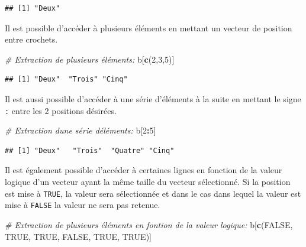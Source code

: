 \documentclass[
]{book}
\newenvironment{Shaded}{\begin{snugshade}}{\end{snugshade}}
\newcommand{\CommentTok}[1]{\textcolor[rgb]{0.56,0.35,0.01}{\textit{#1}}}
\newcommand{\ConstantTok}[1]{\textcolor[rgb]{0.56,0.35,0.01}{#1}}
\newcommand{\DecValTok}[1]{\textcolor[rgb]{0.00,0.00,0.81}{#1}}
\newcommand{\FunctionTok}[1]{\textcolor[rgb]{0.13,0.29,0.53}{\textbf{#1}}}
\newcommand{\NormalTok}[1]{#1}
\newcommand{\SpecialCharTok}[1]{\textcolor[rgb]{0.81,0.36,0.00}{\textbf{#1}}}
\begin{document}
\begin{verbatim}
## [1] "Deux"
\end{verbatim}

Il est possible d'accéder à plusieurs éléments en mettant un vecteur de position entre crochets.

\begin{Shaded}
\begin{Highlighting}[]
\CommentTok{\# Extraction de plusieurs éléments:}
\NormalTok{b[}\FunctionTok{c}\NormalTok{(}\DecValTok{2}\NormalTok{,}\DecValTok{3}\NormalTok{,}\DecValTok{5}\NormalTok{)]}
\end{Highlighting}
\end{Shaded}

\begin{verbatim}
## [1] "Deux"  "Trois" "Cinq"
\end{verbatim}

Il est aussi possible d'accéder à une série d'éléments à la suite en mettant le signe \texttt{:} entre les 2 positions désirées.

\begin{Shaded}
\begin{Highlighting}[]
\CommentTok{\# Extraction d\textquotesingle{}une série d\textquotesingle{}éléments:}
\NormalTok{b[}\DecValTok{2}\SpecialCharTok{:}\DecValTok{5}\NormalTok{]}
\end{Highlighting}
\end{Shaded}

\begin{verbatim}
## [1] "Deux"   "Trois"  "Quatre" "Cinq"
\end{verbatim}

Il est également possible d'accéder à certaines lignes en fonction de la valeur logique d'un vecteur ayant la même taille du vecteur sélectionné. Si la position est mise à \texttt{TRUE}, la valeur sera sélectionnée et dans le cas dans lequel la valeur est mise à \texttt{FALSE} la valeur ne sera pas retenue.

\begin{Shaded}
\begin{Highlighting}[]
\CommentTok{\# Extraction de plusieurs éléments en fontion de la valeur logique:}
\NormalTok{b[}\FunctionTok{c}\NormalTok{(}\ConstantTok{FALSE}\NormalTok{, }\ConstantTok{TRUE}\NormalTok{, }\ConstantTok{TRUE}\NormalTok{, }\ConstantTok{FALSE}\NormalTok{, }\ConstantTok{TRUE}\NormalTok{, }\ConstantTok{TRUE}\NormalTok{)]}
\end{Highlighting}
\end{Shaded}
\end{document}
